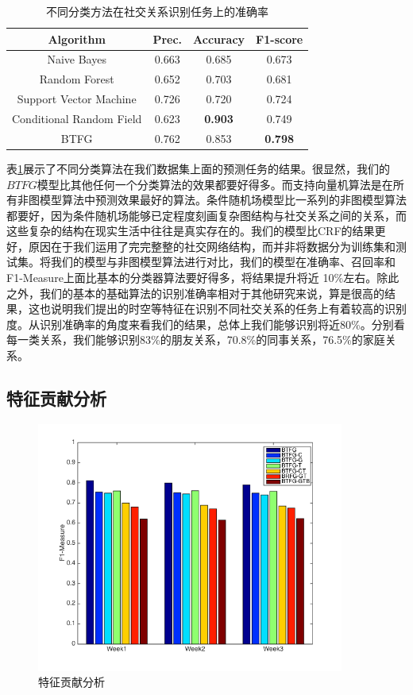 \begin{table}
\centering
\caption{不同分类方法在社交关系识别任务上的准确率}
\label{method-results}

\begin{tabular}{c|c|c|c}
	\hline
Algorithm & Prec. & Accuracy  & F1-score\\ \hline
Naive Bayes &0.663 & 0.685 & 0.673 \\ \hline
Random Forest& 0.652 & 0.703& 0.681 \\ \hline
Support Vector Machine & 0.726 & 0.720 & 0.724\\ \hline
Conditional Random Field & 0.623 & \textbf{0.903} & 0.749 \\ \hline
BTFG & 0.762 & 0.853 & \textbf{0.798} \\ \hline
\end{tabular}
\end{table}

表\ref{method-results}展示了不同分类算法在我们数据集上面的预测任务的结果。很显然，我们的$BTFG$模型比其他任何一个分类算法的效果都要好得多。而支持向量机算法是在所有非图模型算法中预测效果最好的算法。条件随机场模型比一系列的非图模型算法都要好，因为条件随机场能够已定程度刻画复杂图结构与社交关系之间的关系，而这些复杂的结构在现实生活中往往是真实存在的。我们的模型比CRF的结果更好，原因在于我们运用了完完整整的社交网络结构，而并非将数据分为训练集和测试集。将我们的模型与非图模型算法进行对比，我们的模型在准确率、召回率和F1-Measure上面比基本的分类器算法要好得多，将结果提升将近 10\%左右。除此之外，我们的基本的基础算法的识别准确率相对于其他研究来说，算是很高的结果，这也说明我们提出的时空等特征在识别不同社交关系的任务上有着较高的识别度。从识别准确率的角度来看我们的结果，总体上我们能够识别将近80\%。分别看每一类关系，我们能够识别83\%的朋友关系，70.8\%的同事关系，76.5\%的家庭关系。


\subsection{特征贡献分析}


\begin{figure}[!ht]
    \centering
    \includegraphics[scale=1, width=0.9\textwidth]{figure/fcanalysis.png}
    \caption{特征贡献分析}
    \label{fig-factor-contribution-analysis}
\end{figure}


